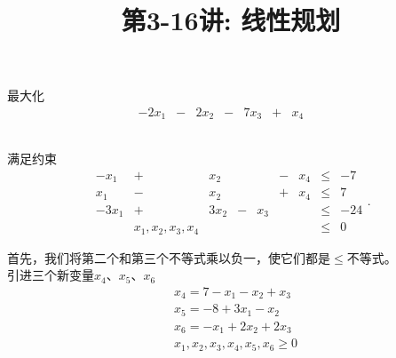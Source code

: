 \documentclass[a4paper, justified]{tufte-handout}
\title{第3-16讲: 线性规划}
\date{\zhtoday} %
\begin{document}
\maketitle
\noplagiarism %
\begin{abstract}
\end{abstract}
\beginrequired

\begin{problem}[TC 29.1-4]
\end{problem}

\begin{solution}
  最大化$$
    \begin{array}{rcrrrrrrr}
      -2 x_1 & - & 2 x_2 & - & 7 x_3 & + & x_4 &  & \\
             &   &       &   &       &   &     &  & \\\end{array}$$\\
  满足约束$$
    \begin{array}{rcrrrrrrr}
      -x_1   & +                  & x_2   &   &     & - & x_4 & \leq & -7  \\
      x_1    & -                  & x_2   &   &     & + & x_4 & \leq & 7   \\
      -3 x_1 & +                  & 3 x_2 & - & x_3 &   &     & \leq & -24 \\
             & x_1, x_2, x_3, x_4 &       &   &     &   &     & \leq & 0
    \end{array} .
  $$
\end{solution}

\begin{problem}[TC 29.1-5]
\end{problem}

\begin{solution}
  首先，我们将第二个和第三个不等式乘以负一，使它们都是$\leq$不等式。\\
  引进三个新变量$x_4、x_5、x_6$
  $$
    \begin{aligned}
       & x_4=7-x_1-x_2+x_3                   \\
       & x_5=-8+3 x_1-x_2                    \\
       & x_6=-x_1+2 x_2+2 x_3                \\
       & x_1, x_2, x_3, x_4, x_5, x_6 \geq 0 \\
       &
    \end{aligned}
  $$
\end{solution}
\end{document}
